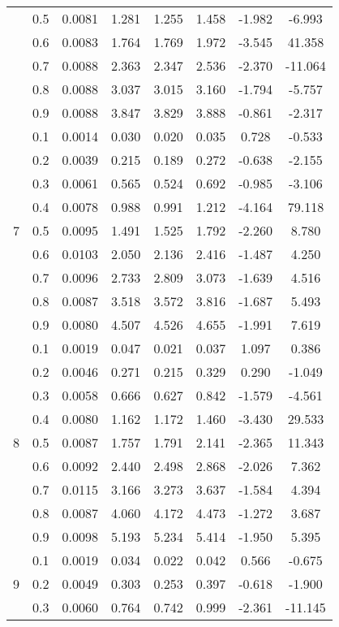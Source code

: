\documentclass[11pt,a4paper]{report}
\begin{document}
\begin{longtable}{ | c | c || c | c | c | c | c | c | }
 & 0.5 & 0.0081 & 1.281 & 1.255 & 1.458 & -1.982 & -6.993 \\
 & 0.6 & 0.0083 & 1.764 & 1.769 & 1.972 & -3.545 & 41.358 \\
 & 0.7 & 0.0088 & 2.363 & 2.347 & 2.536 & -2.370 & -11.064 \\
 & 0.8 & 0.0088 & 3.037 & 3.015 & 3.160 & -1.794 & -5.757 \\
 & 0.9 & 0.0088 & 3.847 & 3.829 & 3.888 & -0.861 & -2.317 \\
 \hline
\multirow{9}{*}{7} & 0.1 & 0.0014 & 0.030 & 0.020 & 0.035 & 0.728 & -0.533 \\
 & 0.2 & 0.0039 & 0.215 & 0.189 & 0.272 & -0.638 & -2.155 \\
 & 0.3 & 0.0061 & 0.565 & 0.524 & 0.692 & -0.985 & -3.106 \\
 & 0.4 & 0.0078 & 0.988 & 0.991 & 1.212 & -4.164 & 79.118 \\
 & 0.5 & 0.0095 & 1.491 & 1.525 & 1.792 & -2.260 & 8.780 \\
 & 0.6 & 0.0103 & 2.050 & 2.136 & 2.416 & -1.487 & 4.250 \\
 & 0.7 & 0.0096 & 2.733 & 2.809 & 3.073 & -1.639 & 4.516 \\
 & 0.8 & 0.0087 & 3.518 & 3.572 & 3.816 & -1.687 & 5.493 \\
 & 0.9 & 0.0080 & 4.507 & 4.526 & 4.655 & -1.991 & 7.619 \\
 \hline
\multirow{9}{*}{8} & 0.1 & 0.0019 & 0.047 & 0.021 & 0.037 & 1.097 & 0.386 \\
 & 0.2 & 0.0046 & 0.271 & 0.215 & 0.329 & 0.290 & -1.049 \\
 & 0.3 & 0.0058 & 0.666 & 0.627 & 0.842 & -1.579 & -4.561 \\
 & 0.4 & 0.0080 & 1.162 & 1.172 & 1.460 & -3.430 & 29.533 \\
 & 0.5 & 0.0087 & 1.757 & 1.791 & 2.141 & -2.365 & 11.343 \\
 & 0.6 & 0.0092 & 2.440 & 2.498 & 2.868 & -2.026 & 7.362 \\
 & 0.7 & 0.0115 & 3.166 & 3.273 & 3.637 & -1.584 & 4.394 \\
 & 0.8 & 0.0087 & 4.060 & 4.172 & 4.473 & -1.272 & 3.687 \\
 & 0.9 & 0.0098 & 5.193 & 5.234 & 5.414 & -1.950 & 5.395 \\
 \hline
\multirow{9}{*}{9} & 0.1 & 0.0019 & 0.034 & 0.022 & 0.042 & 0.566 & -0.675 \\
 & 0.2 & 0.0049 & 0.303 & 0.253 & 0.397 & -0.618 & -1.900 \\
 & 0.3 & 0.0060 & 0.764 & 0.742 & 0.999 & -2.361 & -11.145 \\

\end{longtable}
\end{document}
